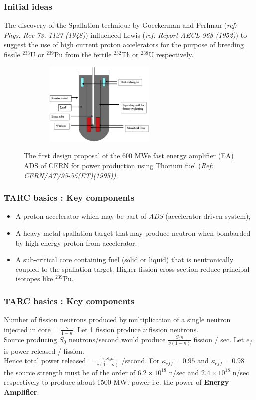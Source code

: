 \documentclass{beamer}
\begin{document}
    \begin{frame}
        \frametitle{Initial ideas}
        The discovery of the Spallation technique by Goeckerman and Perlman ({\tiny \textit {ref: Phys. Rev 73, 1127 (1948)}}) influenced Lewis ({\tiny \textit{ref: Report AECL-968 (1952)}}) to suggest the use of high current proton accelerators for the purpose of breeding fissile $^{233}$U or $^{239}$Pu from the fertile $^{232}$Th or $^{238}$U respectively.
         \begin{figure}
            \includegraphics[height=40mm, width=80mm] {PICS/CERN_initial_concept.png} \label{fig:cern_tarc_reactor_concept_1995}
            \caption{{\tiny {The first design proposal of the 600 MWe fast energy amplifier (EA) ADS of CERN for power production using Thorium fuel ({\tiny \textit{Ref: CERN/AT/95-55(ET)(1995)).}}}}}
        \end{figure}
    \end{frame}

    \begin{frame}
    \frametitle{TARC basics : Key components}
    \begin{itemize}
        \item <1> A proton accelerator which may be part of \textit{ADS} (accelerator driven system), 
        \pause
        \item <2> A heavy metal spallation target that may produce neutron when bombarded by high energy proton from accelerator.
        \pause
        \item <1-3> A sub-critical core containing fuel (solid or liquid) that is neutronically coupled to the spallation target. Higher fission cross section reduce principal isotopes like $^{239}$Pu.
    \end{itemize}
    \end{frame}

    \begin{frame}
    \frametitle{TARC basics : Key components}
    \small{
        Number of fission neutrons produced by multiplication of a single neutron injected in core = $\frac{\kappa}{1-\kappa}$.
        \vskip 3mm
        Let 1 fission produce $\nu$ fission neutrons.\\
        Source producing $S_0$ neutrons/second would produce $\frac{S_0 \kappa}{\nu \left(1-\kappa \right)}$ fission / sec.
        \vskip 3mm
        Let $e_f$ is power released / fission.\\
        Hence total power released = $\frac{e_f S_0 \kappa}{\nu \left(1-\kappa\right)}$ /second.
        \vskip 3mm
        For $\kappa_{eff}=0.95$ and $\kappa_{eff}=0.98$ the source strength must be of the order of $6.2 \times 10^{18}$ n/sec and $2.4 \times 10^{18}$ n/sec respectively to produce about 1500 MWt power i.e. the power of \textbf{Energy Amplifier}.
    }
    \end{frame}
       
\end{document}
